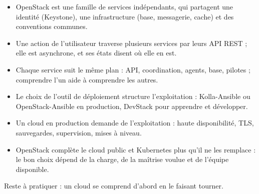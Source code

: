 \begin{aretenir}
\begin{itemize}
  \item OpenStack est une famille de services indépendants, qui partagent une identité (Keystone), une infrastructure (base,
        messagerie, cache) et des conventions communes.
  \item Une action de l'utilisateur traverse plusieurs services par leurs API REST ; elle est asynchrone, et ses états disent où
        elle en est.
  \item Chaque service suit le même plan : API, coordination, agents, base, pilotes ; comprendre l'un aide à comprendre les autres.
  \item Le choix de l'outil de déploiement structure l'exploitation : Kolla-Ansible ou OpenStack-Ansible en production, DevStack pour
        apprendre et développer.
  \item Un cloud en production demande de l'exploitation : haute disponibilité, TLS, sauvegardes, supervision, mises à niveau.
  \item OpenStack complète le cloud public et Kubernetes plus qu'il ne les remplace : le bon choix dépend de la charge, de la
        maîtrise voulue et de l'équipe disponible.
\end{itemize}
\end{aretenir}

Reste à pratiquer : un cloud se comprend d'abord en le faisant tourner.
